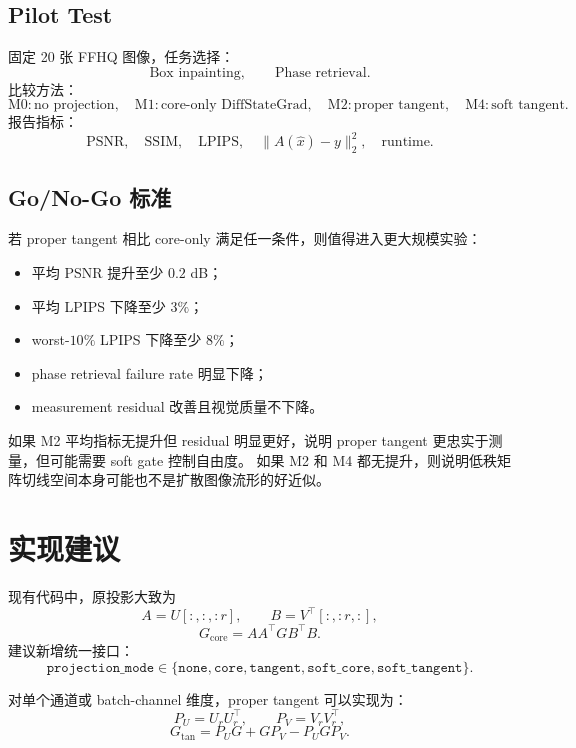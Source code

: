 \documentclass[11pt]{article}
\begin{document}
\subsection{Pilot Test}

固定 20 张 FFHQ 图像，任务选择：
\[
    \text{Box inpainting}, \qquad \text{Phase retrieval}.
\]
比较方法：
\[
    \mathrm{M0}: \text{no projection}, \quad
    \mathrm{M1}: \text{core-only DiffStateGrad}, \quad
    \mathrm{M2}: \text{proper tangent}, \quad
    \mathrm{M4}: \text{soft tangent}.
\]
报告指标：
\[
    \text{PSNR}, \quad \text{SSIM}, \quad \text{LPIPS}, \quad
    \|A(\hat{x})-y\|_2^2, \quad
    \text{runtime}.
\]

\subsection{Go/No-Go 标准}

若 proper tangent 相比 core-only 满足任一条件，则值得进入更大规模实验：
\begin{itemize}
    \item 平均 PSNR 提升至少 $0.2$ dB；
    \item 平均 LPIPS 下降至少 $3\%$；
    \item worst-$10\%$ LPIPS 下降至少 $8\%$；
    \item phase retrieval failure rate 明显下降；
    \item measurement residual 改善且视觉质量不下降。
\end{itemize}

如果 M2 平均指标无提升但 residual 明显更好，说明 proper tangent 更忠实于测量，但可能需要 soft gate 控制自由度。
如果 M2 和 M4 都无提升，则说明低秩矩阵切线空间本身可能也不是扩散图像流形的好近似。

\section{实现建议}

现有代码中，原投影大致为
\[
    A = U[:, :, :r], \qquad B = V^\top[:, :r, :],
\]
\[
    G_{\mathrm{core}} = A A^\top G B^\top B .
\]
建议新增统一接口：
\[
    \texttt{projection\_mode}
    \in
    \{
    \texttt{none},
    \texttt{core},
    \texttt{tangent},
    \texttt{soft\_core},
    \texttt{soft\_tangent}
    \}.
\]

对单个通道或 batch-channel 维度，proper tangent 可以实现为：
\[
    P_U = U_r U_r^\top, \qquad P_V = V_r V_r^\top,
\]
\[
    G_{\mathrm{tan}} = P_U G + G P_V - P_U G P_V.
\]
\end{document}
